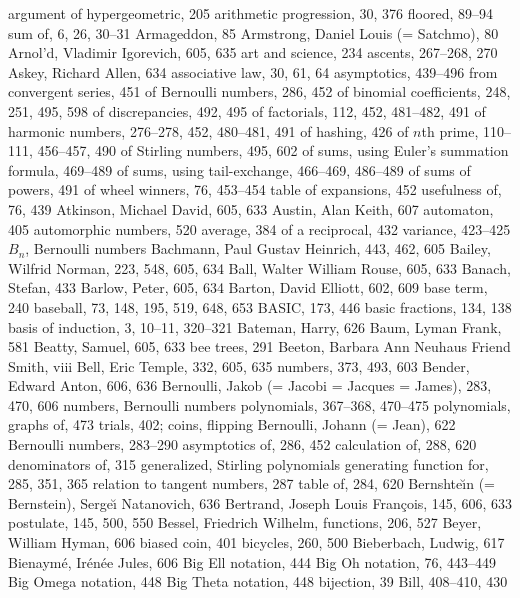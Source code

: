 argument of hypergeometric, 205
arithmetic progression, 30, 376
\sub floored, 89--94
\sub sum of, 6, 26, 30--31
Armageddon, 85
Armstrong, Daniel Louis (= Satchmo), 80
Arnol'd, Vladimir Igorevich, 605, 635
art and science, 234
ascents, 267--268, 270
Askey, Richard Allen, 634
associative law, 30, 61, 64
asymptotics, 439--496
\sub from convergent series, 451
\sub of Bernoulli numbers, 286, 452
\sub of binomial coefficients, 248, 251, 495, 598
\sub of discrepancies, 492, 495
\sub of factorials, 112, 452, 481--482, 491
\sub of harmonic numbers, 276--278, 452, 480--481, 491
\sub of hashing, 426
\sub of $n$th prime, 110--111, 456--457, 490
\sub of Stirling numbers, 495, 602
\sub of sums, using Euler's summation formula, 469--489
\sub of sums, using tail-exchange, 466--469, 486--489
\sub of sums of powers, 491
\sub of wheel winners, 76, 453--454
\sub table of expansions, 452
\sub usefulness of, 76, 439
Atkinson, Michael David, 605, 633
Austin, Alan Keith, 607
automaton, 405
automorphic numbers, 520
average, 384
\sub of a reciprocal, 432
\sub variance, 423--425
\medskip
$B_n$, \see Bernoulli numbers
Bachmann, Paul Gustav Heinrich, 443, 462, 605
Bailey, Wilfrid Norman, 223, 548, 605, 634
Ball, Walter William Rouse, 605, 633
Banach, Stefan, 433
Barlow, Peter, 605, 634
Barton, David Elliott, 602, 609
base term, 240
baseball, 73, 148, 195, 519, 648, 653
BASIC, 173, 446
basic fractions, 134, 138
basis of induction, 3, 10--11, 320--321
Bateman, Harry, 626
Baum, Lyman Frank, 581
Beatty, Samuel, 605, 633
bee trees, 291
Beeton, Barbara Ann Neuhaus Friend Smith, viii
Bell, Eric Temple, 332, 605, 635
\sub numbers, 373, 493, 603
Bender, Edward Anton, 606, 636
Bernoulli, Jakob (= Jacobi = Jacques = James), 283, 470, 606
\sub numbers, \see Bernoulli numbers
\sub polynomials, 367--368, 470--475
\sub polynomials, graphs of, 473
\sub trials, 402; \also coins, flipping
Bernoulli, Johann (= Jean), 622
Bernoulli numbers, 283--290
\sub asymptotics of, 286, 452
\sub calculation of, 288, 620
\sub denominators of, 315
\sub generalized, \see Stirling polynomials
\sub generating function for, 285, 351, 365
\sub relation to tangent numbers, 287
\sub table of, 284, 620
Bernshte{\u\i}n (= Bernstein), Serge{\u\i} Natanovich, 636
Bertrand, Joseph Louis Fran\c{c}ois, 145, 606, 633
\sub postulate, 145, 500, 550
Bessel, Friedrich Wilhelm, functions, 206, 527
Beyer, William Hyman, 606
biased coin, 401
bicycles, 260, 500
Bieberbach, Ludwig, 617
Bienaym\'e, Ir\'en\'ee Jules, 606
Big Ell notation, 444
Big Oh notation, 76, 443--449
Big Omega notation, 448
Big Theta notation, 448
bijection, 39
Bill, 408--410, 430
